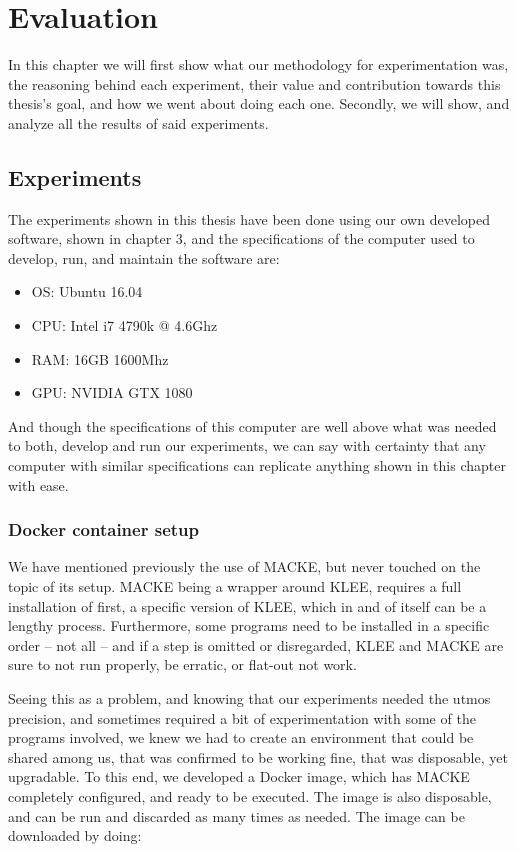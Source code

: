 
\chapter{Evaluation}\label{chapter:Evaluation}

In this chapter we will first show what our methodology for experimentation was, the reasoning behind each experiment, their value and contribution towards this thesis's goal, and how we went about doing each one. Secondly, we will show, and analyze all the results of said experiments.

\section{Experiments}

The experiments shown in this thesis have been done using our own developed software, shown in chapter 3, and the specifications of the computer used to develop, run, and maintain the software are:

\begin{itemize}
	\item OS: Ubuntu 16.04
	\item CPU: Intel i7 4790k @ 4.6Ghz
	\item RAM: 16GB 1600Mhz
	\item GPU: NVIDIA GTX 1080
\end{itemize}

And though the specifications of this computer are well above what was needed to both, develop and run our experiments, we can say with certainty that any computer with similar specifications can replicate anything shown in this chapter with ease.

\subsection{Docker container setup}

We have mentioned previously the use of MACKE, but never touched on the topic of its setup. MACKE being a wrapper around KLEE, requires a full installation of first, a specific version of KLEE, which in and of itself can be a lengthy process. Furthermore, some programs need to be installed in a specific order -- not all -- and if a step is omitted or disregarded, KLEE and MACKE are sure to not run properly, be erratic, or flat-out not work.

Seeing this as a problem, and knowing that our experiments needed the utmos precision, and sometimes required a bit of experimentation with some of the programs involved, we knew we had to create an environment that could be shared among us, that was confirmed to be working fine, that was disposable, yet upgradable. To this end, we developed a Docker \parencite{docker} image, which has MACKE completely configured, and ready to be executed. The image is also disposable, and can be run and discarded as many times as needed. The image can be downloaded by doing:

